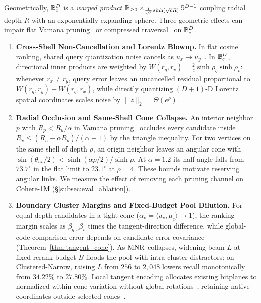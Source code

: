 Geometrically, $\mathbb{B}_c^D$ is a \emph{warped product} $\mathbb{R}_{\ge 0} \times_{\frac{1}{\sqrt{c}}\sinh(\sqrt{c}R)} \mathbb{S}^{D-1}$ coupling radial depth $R$ with an exponentially expanding sphere.
Three geometric effects can impair flat {Vamana} pruning~\cite{subramanya2019diskann} or compressed traversal~\cite{aguerrebere2023similarity,gao2024rabitq,xiao2026quiver} on $\mathbb{B}_c^D$.
\begin{enumerate}
  \item \textbf{Cross-Shell Non-Cancellation and Lorentz Blowup.}
  In flat cosine ranking, shared query quantization noise cancels as $u_x \to u_y$~\cite{xiao2026decisions}.
  In $\mathbb{B}_c^D$, directional inner products are weighted by $W(r_q, r_v) = \frac{2}{c}\sinh\rho_q\sinh\rho_v$: whenever $r_x \ne r_y$, query error leaves an uncancelled residual proportional to $W(r_q, r_y) - W(r_q, r_x)$, while directly quantizing $(D+1)$-D {Lorentz} spatial coordinates scales noise by $\|\tilde{z}\|_2 = \Theta(e^\rho)$.

  \item \textbf{Radial Occlusion and Same-Shell Cone Collapse.}
  An interior neighbor $p$ with $R_p<R_u/\alpha$ in {Vamana} pruning~\cite{subramanya2019diskann} occludes every candidate inside $R_v\le(R_u-\alpha R_p)/(\alpha+1)$ by the triangle inequality. For two vertices on the same shell of depth $\rho$, an origin neighbor leaves an angular cone with $\sin(\theta_{uv}/2)<\sinh(\alpha\rho/2)/\sinh\rho$. At $\alpha=1.2$ its half-angle falls from $73.7^\circ$ in the flat limit to $23.1^\circ$ at $\rho=4$.
  These bounds motivate reserving angular links. We measure the effect of removing each pruning channel on {Cohere-1M} (\S\ref{subsec:eval_ablation}).

  \item \textbf{Boundary Cluster Margins and Fixed-Budget Pool Dilution.}
  For equal-depth candidates in a tight cone ($\alpha_v = \langle u_v, \mu_c\rangle \to 1$), the ranking margin scales as $\beta_{q,c}\beta_v$ times the tangent-direction difference, while global-code comparison error depends on candidate-error covariance (Theorem~\ref{thm:tangent_cone}).
  As {$\mathrm{MNR}$} collapses, widening beam $L$ at fixed rerank budget $B$ floods the pool with intra-cluster distractors: on {Clustered-Narrow}, raising $L$ from $256$ to $2{,}048$ lowers recall monotonically from $34.22\%$ to $27.80\%$. Local tangent encoding allocates existing bitplanes to normalized within-cone variation without global rotations~\cite{gao2024rabitq,ge2013opq}, retaining native coordinates outside selected cones~\cite{xiao2026decisions}.
\end{enumerate}

